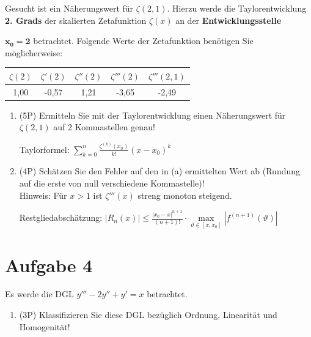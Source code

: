 \documentclass[12pt]{article}
\begin{document}
Gesucht ist ein Näherungswert für $\zeta(2{,}1)$. Hierzu werde die Taylorentwicklung \textbf{2. Grads} der skalierten Zetafunktion $\zeta(x)$ an der \textbf{Entwicklungsstelle} {$\mathbf{x_0=2}$ betrachtet. Folgende Werte der Zetafunktion benötigen Sie möglicherweise:

\begin{center}
\begin{tabular}{ c | c | c | c | c}
 $\zeta(2)$ & $\zeta'(2)$ & $\zeta''(2)$ & $\zeta'''(2)$ & $\zeta'''(2{,}1)$ \\
 \hline
 1{,}00         &  -0{,}57         & 1{,}21           &  -3{,}65           & -2{,}49
\end{tabular}
\end{center}

\begin{enumerate}[label=(\alph*)]

\item (5P) Ermitteln Sie mit der Taylorentwicklung einen Näherungswert für $\zeta(2{,}1)$ auf 2 Kommastellen genau!

Taylorformel: $\sum\limits_{k=0}^n\frac{\zeta^{(k)}(x_0)}{k!}(x-x_0)^k$

\bigskip
\bigskip
\bigskip
\bigskip
\bigskip
\bigskip
\bigskip
\bigskip
\bigskip
\bigskip
\bigskip
\bigskip
\bigskip
\bigskip
\bigskip
\bigskip
\bigskip

\item (4P) Schätzen Sie den Fehler auf den in (a) ermittelten Wert  ab (Rundung auf die erste von null verschiedene Kommastelle)!\\
Hinweis: Für $x>1$ ist $\zeta'''(x)$ streng monoton steigend.

Restgliedabschätzung: $|R_n(x)| \le \frac{|x_0-x|^{n+1}}{(n+1)!}\cdot\max\limits_{\vartheta\in[x,x_0]} |f^{(n+1)}(\vartheta)|$


\end{enumerate}

\newpage
\section* {Aufgabe 4}

Es werde die DGL $y'''-2y''+y'=x$ betrachtet.

\begin{enumerate}[label=(\alph*)]

\item (3P) Klassifizieren Sie diese DGL bezüglich Ordnung, Linearität und Homogenität! 


\end{enumerate}}
\end{document}
